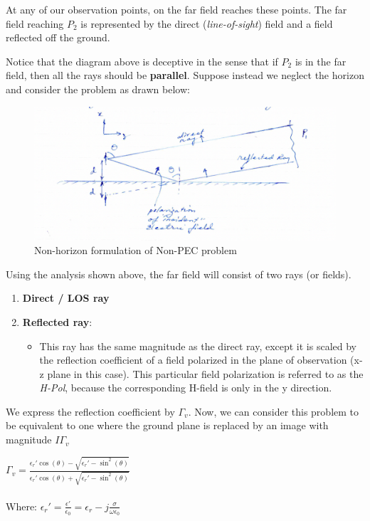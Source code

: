 \documentclass{article}
\begin{document}
At any of our observation points, on the far field reaches these points. The far field reaching $P_2$ is represented by the direct (\textit{line-of-sight}) field and a field reflected off the ground.

Notice that the diagram above is deceptive in the sense that if $P_2$ is in the far field, then all the rays should be \textbf{parallel}. Suppose instead we neglect the horizon and consider the problem as drawn below:

\begin{figure}[H]
  \centering
     \includegraphics[scale=0.45]{Course Notes/images/9.5.png}
  \caption{Non-horizon formulation of Non-PEC problem}
\end{figure}

Using the analysis shown above, the far field will consist of two rays (or fields). 
\begin{enumerate}
    \item \textbf{Direct / LOS ray}
    \item \textbf{Reflected ray}:
    \begin{itemize}
        \item This ray has the same magnitude as the direct ray, except it is scaled by the reflection coefficient of a field polarized in the plane of observation (x-z plane in this case). 
        \tiem This particular field polarization is referred to as the \textit{H-Pol}, because the corresponding H-field is only in the y direction. 
    \end{itemize}
\end{enumerate}

We express the reflection coefficient by $\Gamma_v$. Now, we can consider this problem to be equivalent to one where the ground plane is replaced by an image with magnitude $I\Gamma_v$

\begin{center}
    $\Gamma_v = \frac{\epsilon_r' \cos(\theta) - \sqrt{\epsilon_r' -\sin^2(\theta)}}{\epsilon_r' \cos(\theta) + \sqrt{\epsilon_r' -\sin^2(\theta)}}$
    \\ \hspace{} \\
    Where: $\epsilon_r' = \frac{\epsilon'}{\epsilon_0} = \epsilon_r - j\frac{\sigma}{\omega\epsilon_0}$
\end{center}
\end{document}
